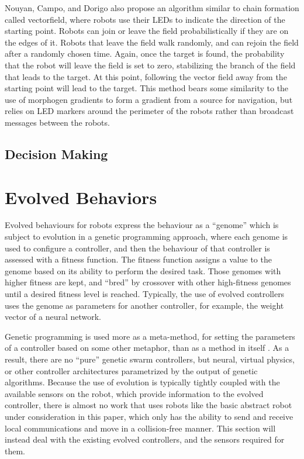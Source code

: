 \documentclass[]{article}
\begin{document}
Nouyan, Campo, and Dorigo also propose an algorithm similar to chain formation called vectorfield, where robots use their LEDs to indicate the direction of the starting point.
Robots can join or leave the field probabilistically if they are on the edges of it. 
Robots that leave the field walk randomly, and can rejoin the field after a randomly chosen time.
Again, once the target is found, the probability that the robot will leave the field is set to zero, stabilizing the branch of the field that leads to the target. 
At this point, following the vector field away from the starting point will lead to the target. 
This method bears some similarity to the use of morphogen gradients to form a gradient from a source for navigation, but relies on LED markers around the perimeter of the robots rather than broadcast messages between the robots. 

\subsection{Decision Making}

\section{Evolved Behaviors}

Evolved behaviours for robots express the behaviour as a ``genome'' which is subject to evolution in a genetic programming approach, where each genome is used to configure a controller, and then the behaviour of that controller is assessed with a fitness function. 
The fitness function assigns a value to the genome based on its ability to perform the desired task. 
Those genomes with higher fitness are kept, and ``bred'' by crossover with other high-fitness genomes until a desired fitness level is reached. 
Typically, the use of evolved controllers uses the genome as parameters for another controller, for example, the weight vector of a neural network. 

Genetic programming is used more as a meta-method, for setting the parameters of a controller based on some other metaphor, than as a method in itself \cite{fehervari2013evolution}. 
As a result, there are no ``pure'' genetic swarm controllers, but neural, virtual physics, or other controller architectures parametrized by the output of genetic algorithms. 
Because the use of evolution is typically tightly coupled with the available sensors on the robot, which provide information to the evolved controller, there is almost no work that uses robots like the basic abstract robot under consideration in this paper, which only has the ability to send and receive local communications and move in a collision-free manner. 
This section will instead deal with the existing evolved controllers, and the sensors required for them. 
\end{document}

